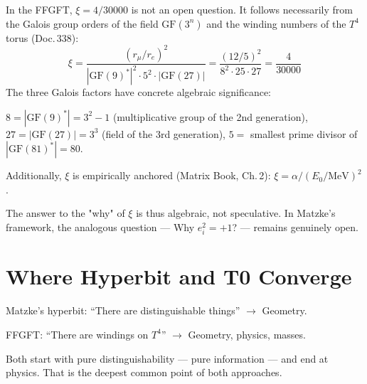 In the FFGFT, $\xi = 4/30000$ is not an open question. It follows necessarily
from the Galois group orders of the field $\mathrm{GF}(3^n)$ and the
winding numbers of the $T^4$ torus (Doc.\,338):
\[
  \xi
  = \frac{(r_\mu/r_e)^2}{|\mathrm{GF}(9)^*|^2 \cdot 5^2 \cdot |\mathrm{GF}(27)|}
  = \frac{(12/5)^2}{8^2 \cdot 25 \cdot 27}
  = \frac{4}{30000}
\]
The three Galois factors have concrete algebraic significance: 

$8 = |\mathrm{GF}(9)^*| = 3^2 - 1$ (multiplicative group of the 2nd generation),
$27 = |\mathrm{GF}(27)| = 3^3$ (field of the 3rd generation),
$5 = $ smallest prime divisor of $|\mathrm{GF}(81)^*| = 80$.

Additionally, $\xi$ is empirically anchored (Matrix Book, Ch.\,2):
$\xi = \alpha / (E_0/\mathrm{MeV})^2$.

The answer to the "why" of $\xi$ is thus algebraic, not
speculative. In Matzke's framework, the analogous question --- Why
$e_i^2 = +1$? --- remains genuinely open.

\section{Where Hyperbit and T0 Converge}

Matzke's hyperbit: \enquote{There are distinguishable things} $\to$ Geometry.

FFGFT: \enquote{There are windings on $T^4$} $\to$ Geometry, physics, masses.

Both start with pure distinguishability --- pure information ---
and end at physics. That is the deepest common point of both approaches.
